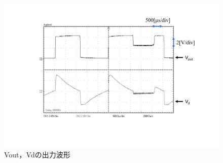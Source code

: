 \documentclass[10pt, a4j, dvipdfmx]{jarticle}
\makeatletter
\newcommand{\figcaption}[1]{\def\@captype{figure}\caption{#1}}
\makeatother
\begin{document}
\begin{figure}[H]
	\centering
	\includegraphics[width=\hsize]{images/r105m-Vout-Vd.png}
	\figcaption{Vout，Vdの出力波形}
	\label{r105m-Vout-Vd}
\end{figure}

\newpage
\end{document}
